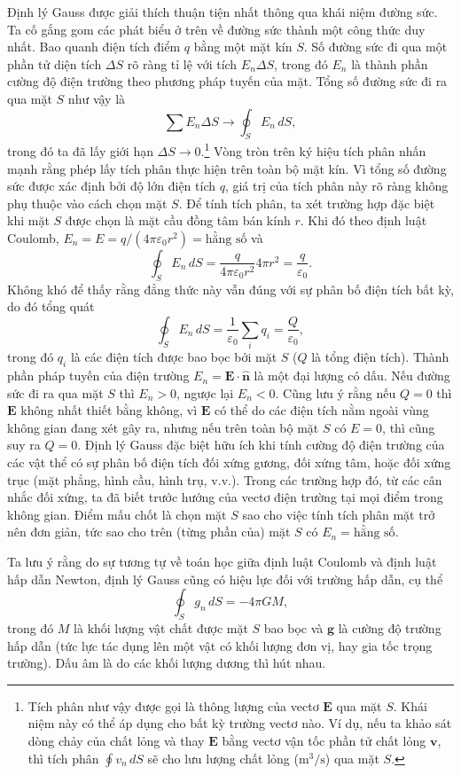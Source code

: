 Định lý Gauss được giải thích thuận tiện nhất thông qua khái niệm đường sức. Ta cố gắng gom các phát biểu ở trên về đường sức thành một công thức duy nhất. Bao quanh điện tích điểm $q$ bằng một mặt kín $S$. Số đường sức đi qua một phần tử diện tích $\Delta S$ rõ ràng tỉ lệ với tích $E_n\Delta S$, trong đó $E_n$ là thành phần cường độ điện trường theo phương pháp tuyến của mặt. Tổng số đường sức đi ra qua mặt $S$ như vậy là
\[
\sum E_n \Delta S \to \oint_S E_n\,dS,
\]
trong đó ta đã lấy giới hạn $\Delta S \to 0$.\footnote{Tích phân như vậy được gọi là thông lượng của vectơ $\mathbf{E}$ qua mặt $S$. Khái niệm này có thể áp dụng cho bất kỳ trường vectơ nào. Ví dụ, nếu ta khảo sát dòng chảy của chất lỏng và thay $\mathbf{E}$ bằng vectơ vận tốc phần tử chất lỏng $\mathbf{v}$, thì tích phân $\oint v_n\,dS$ sẽ cho lưu lượng chất lỏng ($\mathrm{m}^3/\mathrm{s}$) qua mặt $S$.} Vòng tròn trên ký hiệu tích phân nhấn mạnh rằng phép lấy tích phân thực hiện trên toàn bộ mặt kín. Vì tổng số đường sức được xác định bởi độ lớn điện tích $q$, giá trị của tích phân này rõ ràng không phụ thuộc vào cách chọn mặt $S$. Để tính tích phân, ta xét trường hợp đặc biệt khi mặt $S$ được chọn là mặt cầu đồng tâm bán kính $r$. Khi đó theo định luật Coulomb, $E_n = E = q/(4\pi\varepsilon_0 r^2) = \text{hằng số}$ và
\[
\oint_S E_n\,dS = \frac{q}{4\pi\varepsilon_0 r^2}4\pi r^2 = \frac{q}{\varepsilon_0}.
\]
Không khó để thấy rằng đẳng thức này vẫn đúng với sự phân bố điện tích bất kỳ, do đó tổng quát
\[
\oint_S E_n\,dS = \frac{1}{\varepsilon_0}\sum_i q_i = \frac{Q}{\varepsilon_0},
\]
trong đó $q_i$ là các điện tích được bao bọc bởi mặt $S$ ($Q$ là tổng điện tích). Thành phần pháp tuyến của điện trường $E_n = \mathbf{E}\cdot\hat{\mathbf{n}}$ là một đại lượng có dấu. Nếu đường sức đi ra qua mặt $S$ thì $E_n>0$, ngược lại $E_n<0$. Cũng lưu ý rằng nếu $Q=0$ thì $\mathbf{E}$ không nhất thiết bằng không, vì $\mathbf{E}$ có thể do các điện tích nằm ngoài vùng không gian đang xét gây ra, nhưng nếu trên toàn bộ mặt $S$ có $E=0$, thì cũng suy ra $Q=0$. Định lý Gauss đặc biệt hữu ích khi tính cường độ điện trường của các vật thể có sự phân bố điện tích đối xứng gương, đối xứng tâm, hoặc đối xứng trục (mặt phẳng, hình cầu, hình trụ, v.v.). Trong các trường hợp đó, từ các cân nhắc đối xứng, ta đã biết trước hướng của vectơ điện trường tại mọi điểm trong không gian. Điểm mấu chốt là chọn mặt $S$ sao cho việc tính tích phân mặt trở nên đơn giản, tức sao cho trên (từng phần của) mặt $S$ có $E_n = \text{hằng số}$.

Ta lưu ý rằng do sự tương tự về toán học giữa định luật Coulomb và định luật hấp dẫn Newton, định lý Gauss cũng có hiệu lực đối với trường hấp dẫn, cụ thể
\[
\oint_S g_n\,dS = -4\pi G M,
\]
trong đó $M$ là khối lượng vật chất được mặt $S$ bao bọc và $\mathbf{g}$ là cường độ trường hấp dẫn (tức lực tác dụng lên một vật có khối lượng đơn vị, hay gia tốc trọng trường). Dấu âm là do các khối lượng dương thì hút nhau.

